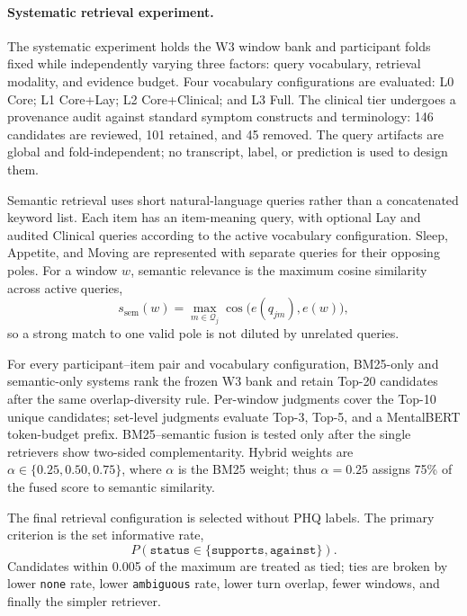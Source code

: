 \documentclass{article}
\begin{document}
\paragraph{Systematic retrieval experiment.}
The systematic experiment holds the W3 window bank and participant folds fixed while independently varying three factors: query vocabulary, retrieval modality, and evidence budget. Four vocabulary configurations are evaluated: L0 Core; L1 Core+Lay; L2 Core+Clinical; and L3 Full. The clinical tier undergoes a provenance audit against standard symptom constructs and terminology: 146 candidates are reviewed, 101 retained, and 45 removed. The query artifacts are global and fold-independent; no transcript, label, or prediction is used to design them.

Semantic retrieval uses short natural-language queries rather than a concatenated keyword list. Each item has an item-meaning query, with optional Lay and audited Clinical queries according to the active vocabulary configuration. Sleep, Appetite, and Moving are represented with separate queries for their opposing poles. For a window $w$, semantic relevance is the maximum cosine similarity across active queries,
\begin{equation}
 s_{\mathrm{sem}}(w)=\max_{m\in\mathcal{Q}_j}
 \cos\bigl(e(q_{jm}),e(w)\bigr),
\end{equation}
so a strong match to one valid pole is not diluted by unrelated queries.

For every participant--item pair and vocabulary configuration, BM25-only and semantic-only systems rank the frozen W3 bank and retain Top-20 candidates after the same overlap-diversity rule. Per-window judgments cover the Top-10 unique candidates; set-level judgments evaluate Top-3, Top-5, and a MentalBERT token-budget prefix. BM25--semantic fusion is tested only after the single retrievers show two-sided complementarity. Hybrid weights are $\alpha\in\{0.25,0.50,0.75\}$, where $\alpha$ is the BM25 weight; thus $\alpha=0.25$ assigns 75\% of the fused score to semantic similarity.

The final retrieval configuration is selected without PHQ labels. The primary criterion is the set informative rate,
\begin{equation}
 P(\texttt{status}\in\{\texttt{supports},\texttt{against}\}).
\end{equation}
Candidates within 0.005 of the maximum are treated as tied; ties are broken by lower \texttt{none} rate, lower \texttt{ambiguous} rate, lower turn overlap, fewer windows, and finally the simpler retriever.
\end{document}
